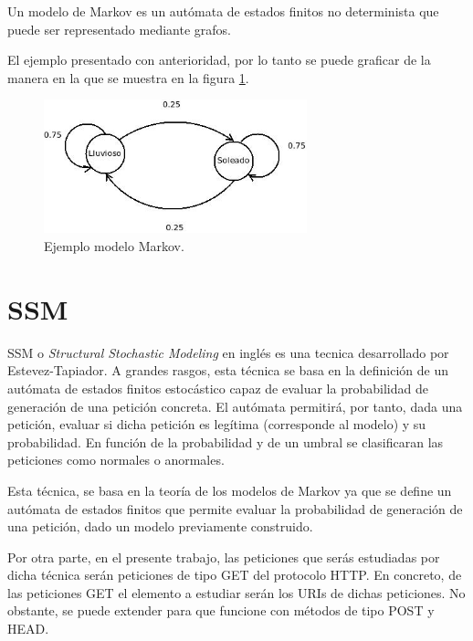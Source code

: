 Un modelo de Markov es un autómata de estados finitos no determinista que puede ser representado mediante grafos.

El ejemplo presentado con anterioridad, por lo tanto se puede graficar de la manera en la que se muestra en la figura \ref{fig:modeloMarkov}.

\begin{figure}[tb]
\begin{center}
\includegraphics[width=3in]{./img/ejemploMarkov.jpeg}
\caption{Ejemplo modelo Markov.}
\label{fig:modeloMarkov}
\end{center}
\end{figure}


\section{SSM}\label{sec:modeloSSM}

SSM o \textit{Structural Stochastic Modeling} en ingl\'es es una tecnica desarrollado por Estevez-Tapiador. A grandes rasgos, esta t\'ecnica se basa en la definición de un autómata de estados finitos estocástico capaz de evaluar la probabilidad de generación de una petición concreta. El autómata permitirá, por tanto, dada una petición, evaluar si dicha petición es legítima (corresponde al modelo) y su probabilidad. En función de la probabilidad y de un umbral se clasificaran las peticiones como normales o anormales.\cite{ssm}

Esta t\'ecnica, se basa en la teor\'ia de los modelos de Markov ya que se define un autómata de estados finitos que permite evaluar la probabilidad de generaci\'on de una petici\'on, dado un modelo previamente construido.

Por otra parte, en el presente trabajo, las peticiones que ser\'as estudiadas por dicha t\'ecnica ser\'an peticiones de tipo GET del protocolo HTTP. En concreto, de las peticiones GET el elemento a estudiar ser\'an los URIs de dichas peticiones. No obstante, se puede extender para que funcione con m\'etodos de tipo POST y HEAD. 

